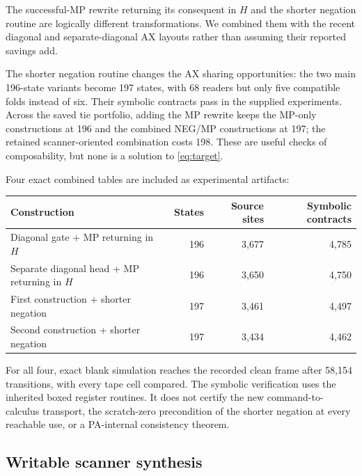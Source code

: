 \documentclass[10pt,letterpaper]{article}
\begin{document}
The successful-MP rewrite returning its consequent in $H$ and the shorter
negation routine are logically different transformations. We combined them
with the recent diagonal and separate-diagonal AX layouts rather than
assuming their reported savings add.

The shorter negation routine changes the AX sharing opportunities: the two
main 196-state variants become 197 states, with 68 readers but only five
compatible folds instead of six. Their symbolic contracts pass in the supplied
experiments. Across the saved tie portfolio, adding the MP rewrite keeps the
MP-only constructions at 196 and the combined NEG/MP constructions at 197;
the retained scanner-oriented combination costs 198. These are useful checks
of composability, but none is a solution to \eqref{eq:target}.

Four exact combined tables are included as experimental artifacts:
\begin{center}\small
\begin{tabular}{@{}lrrr@{}}
\toprule
Construction & States & Source sites & Symbolic contracts\\\midrule
Diagonal gate + MP returning in $H$ &196&3,677&4,785\\
Separate diagonal head + MP returning in $H$ &196&3,650&4,750\\
First construction + shorter negation &197&3,461&4,497\\
Second construction + shorter negation &197&3,434&4,462\\
\bottomrule
\end{tabular}\end{center}
For all four, exact blank simulation reaches the recorded clean frame after
58,154 transitions, with every tape cell compared. The symbolic verification
uses the inherited boxed register routines. It does not certify the new
command-to-calculus transport, the scratch-zero precondition of the shorter
negation at every reachable use, or a PA-internal consistency theorem.

\subsection{Writable scanner synthesis}
\end{document}
